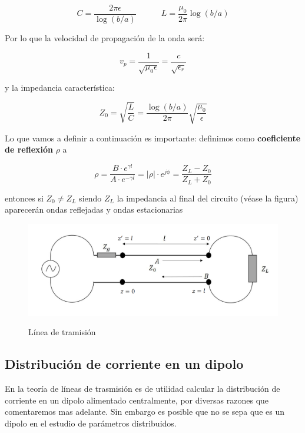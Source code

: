 \documentclass[12pt]{article}
\newcommand{\tquad}{\quad \quad \quad}
\begin{document}
\begin{equation}
C = \dfrac{2 \pi \epsilon}{\log (b/a)} \tquad L = \dfrac{\mu_0}{2 \pi} \log (b/a)
\end{equation}

Por lo que la velocidad de propagación de la onda será:

\begin{equation}
v_p = \dfrac{1}{\sqrt{\mu_0 \epsilon}} = \dfrac{c}{\sqrt{\epsilon_r}}
\end{equation}

y la impedancia característica:

\begin{equation}
Z_0 = \sqrt{\frac{L}{C}} = \dfrac{\log(b/a)}{2 \pi } \sqrt{\frac{\mu_0}{\epsilon}}
\end{equation}

Lo que vamos a definir a continuación es importante: definimos como \textbf{coeficiente de reflexión} $\rho$ a

\begin{equation}
\rho = \dfrac{B \cdot e^{\gamma l}}{A \cdot e^{-\gamma l}} = |\rho| \cdot e^{j \phi} = \dfrac{Z_L - Z_0}{Z_L + Z_0}
\end{equation}
 
entonces si $Z_0 \neq Z_L$ siendo $Z_L$ la impedancia al final del circuito (véase la figura) aparecerán ondas reflejadas y ondas estacionarias
 

\begin{figure}[h!] \centering
\includegraphics[scale=0.5]{lineatrasmision3.png} \label{Fig:8.2-004}
\caption{Línea de tramisión}
\end{figure}

 
\subsection{Distribución de corriente en un dipolo}

En la teoría de líneas de trasmisión es de utilidad calcular la distribución de corriente en un dipolo alimentado centralmente, por diversas razones que comentaremos mas adelante. Sin embargo es posible que no se sepa que es un dipolo en el estudio de parámetros distribuidos. \\
\end{document}

